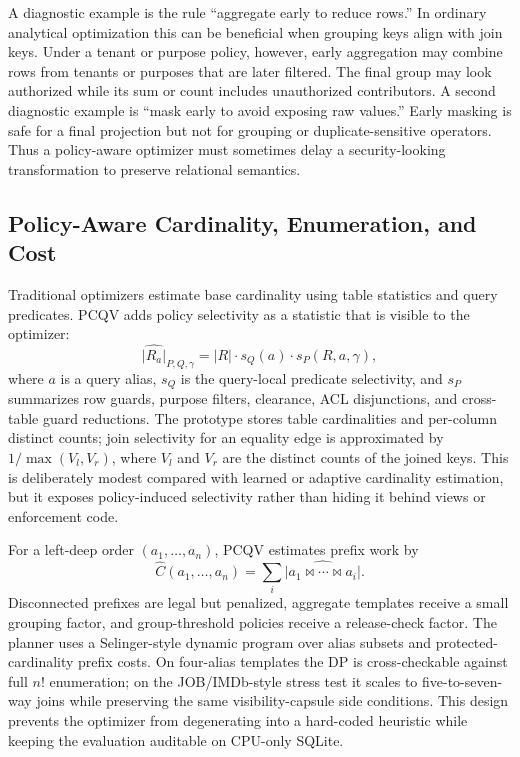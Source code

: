 \documentclass[conference]{IEEEtran}
\newcommand{\pcqv}{PCQV}
\newcommand{\ctx}{\gamma}
\begin{document}
A diagnostic example is the rule ``aggregate early to reduce rows.'' In ordinary analytical optimization this can be beneficial when grouping keys align with join keys. Under a tenant or purpose policy, however, early aggregation may combine rows from tenants or purposes that are later filtered. The final group may look authorized while its sum or count includes unauthorized contributors. A second diagnostic example is ``mask early to avoid exposing raw values.'' Early masking is safe for a final projection but not for grouping or duplicate-sensitive operators. Thus a policy-aware optimizer must sometimes delay a security-looking transformation to preserve relational semantics.


\subsection{Policy-Aware Cardinality, Enumeration, and Cost}
Traditional optimizers estimate base cardinality using table statistics and query predicates. \pcqv{} adds policy selectivity as a statistic that is visible to the optimizer:
\begin{equation}
\widehat{|R_a|}_{P,Q,\ctx}=|R| \cdot s_Q(a) \cdot s_P(R,a,\ctx),
\end{equation}
where $a$ is a query alias, $s_Q$ is the query-local predicate selectivity, and $s_P$ summarizes row guards, purpose filters, clearance, ACL disjunctions, and cross-table guard reductions. The prototype stores table cardinalities and per-column distinct counts; join selectivity for an equality edge is approximated by $1/\max(V_l,V_r)$, where $V_l$ and $V_r$ are the distinct counts of the joined keys. This is deliberately modest compared with learned or adaptive cardinality estimation, but it exposes policy-induced selectivity rather than hiding it behind views or enforcement code.

For a left-deep order $(a_1,\ldots,a_n)$, \pcqv{} estimates prefix work by
\begin{equation}
\widehat{C}(a_1,\ldots,a_n)=\sum_i \widehat{|a_1 \Join \cdots \Join a_i|}.
\end{equation}
Disconnected prefixes are legal but penalized, aggregate templates receive a small grouping factor, and group-threshold policies receive a release-check factor. The planner uses a Selinger-style dynamic program over alias subsets and protected-cardinality prefix costs. On four-alias templates the DP is cross-checkable against full $n!$ enumeration; on the JOB/IMDb-style stress test it scales to five-to-seven-way joins while preserving the same visibility-capsule side conditions. This design prevents the optimizer from degenerating into a hard-coded heuristic while keeping the evaluation auditable on CPU-only SQLite.
\end{document}
